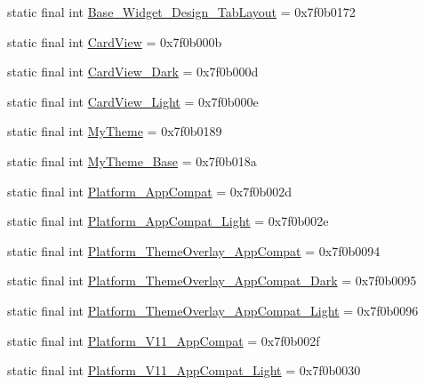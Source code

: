 \begin{CompactItemize}
\item 
static final int \hyperlink{classandroid_1_1support_1_1v7_1_1cardview_1_1_r_1_1style_98f5332331dd74e916ccf30267311061}{Base\_\-Widget\_\-Design\_\-TabLayout} = 0x7f0b0172
\item 
static final int \hyperlink{classandroid_1_1support_1_1v7_1_1cardview_1_1_r_1_1style_792e7e0f95e8b7327b713bd96e75640c}{CardView} = 0x7f0b000b
\item 
static final int \hyperlink{classandroid_1_1support_1_1v7_1_1cardview_1_1_r_1_1style_c6d6250429f101cc5250ab74aaa333c1}{CardView\_\-Dark} = 0x7f0b000d
\item 
static final int \hyperlink{classandroid_1_1support_1_1v7_1_1cardview_1_1_r_1_1style_bc9c2b0e42cf23c12b173a6b92e2867d}{CardView\_\-Light} = 0x7f0b000e
\item 
static final int \hyperlink{classandroid_1_1support_1_1v7_1_1cardview_1_1_r_1_1style_1cd1f55547af7e60403586fafaac490e}{MyTheme} = 0x7f0b0189
\item 
static final int \hyperlink{classandroid_1_1support_1_1v7_1_1cardview_1_1_r_1_1style_294385d8a0c1a9bb0d883c6b7c5d5a5e}{MyTheme\_\-Base} = 0x7f0b018a
\item 
static final int \hyperlink{classandroid_1_1support_1_1v7_1_1cardview_1_1_r_1_1style_d8550e06db4e9f26a777d149a0db7317}{Platform\_\-AppCompat} = 0x7f0b002d
\item 
static final int \hyperlink{classandroid_1_1support_1_1v7_1_1cardview_1_1_r_1_1style_62aacc3d9783718c824678fa41763f61}{Platform\_\-AppCompat\_\-Light} = 0x7f0b002e
\item 
static final int \hyperlink{classandroid_1_1support_1_1v7_1_1cardview_1_1_r_1_1style_10612504f8c4555c8583b912f91b90a6}{Platform\_\-ThemeOverlay\_\-AppCompat} = 0x7f0b0094
\item 
static final int \hyperlink{classandroid_1_1support_1_1v7_1_1cardview_1_1_r_1_1style_5b2c584aeec7688ab07459882d302a1d}{Platform\_\-ThemeOverlay\_\-AppCompat\_\-Dark} = 0x7f0b0095
\item 
static final int \hyperlink{classandroid_1_1support_1_1v7_1_1cardview_1_1_r_1_1style_9760202ba3b16df2c5bea611d53ddaeb}{Platform\_\-ThemeOverlay\_\-AppCompat\_\-Light} = 0x7f0b0096
\item 
static final int \hyperlink{classandroid_1_1support_1_1v7_1_1cardview_1_1_r_1_1style_2754b432dfedeaa4d87a900007e2ea3d}{Platform\_\-V11\_\-AppCompat} = 0x7f0b002f
\item 
static final int \hyperlink{classandroid_1_1support_1_1v7_1_1cardview_1_1_r_1_1style_cbbddf68be0264a5a7969fd7eb145909}{Platform\_\-V11\_\-AppCompat\_\-Light} = 0x7f0b0030

\end{CompactItemize}
